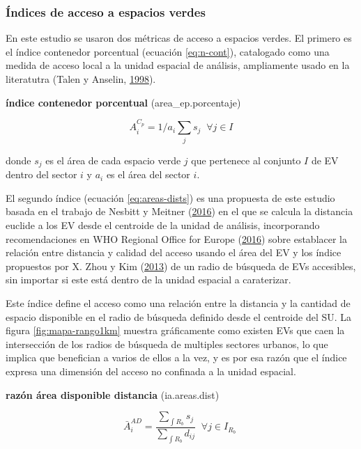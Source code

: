 \documentclass[12pt,a4paper,openany]{book}
\theoremstyle{definition}
\theoremstyle{definition}
\theoremstyle{definition}
\theoremstyle{remark}
\begin{document}
\subsubsection{Índices de acceso a espacios
verdes}\label{indices-de-acceso-a-espacios-verdes}

En este estudio se usaron dos métricas de acceso a espacios verdes. El
primero es el índice contenedor porcentual (ecuación \eqref{eq:n-cont}),
catalogado como una medida de acceso local a la unidad espacial de
análisis, ampliamente usado en la literatutra (Talen y Anselin,
\protect\hyperlink{ref-talen_assessing_1998}{1998}).

\textbf{índice contenedor porcentual} (area\_ep.porcentaje)

\begin{equation}
A^{C_p}_i =1/a_i\sum_j{s_j} \;  \; \forall  j \in I
\label{eq:n-cont}
\end{equation}

donde \(s_j\) es el área de cada espacio verde \(j\) que pertenece al
conjunto \(I\) de EV dentro del sector \(i\) y \(a_i\) es el área del
sector \(i\).

El segundo índice (ecuación \eqref{eq:areas-dists}) es una propuesta de
este estudio basada en el trabajo de Nesbitt y Meitner
(\protect\hyperlink{ref-nesbitt_exploring_2016}{2016}) en el que se
calcula la distancia euclide a los EV desde el centroide de la unidad de
análisis, incorporando recomendaciones en WHO Regional Office for Europe
(\protect\hyperlink{ref-who2016urban}{2016}) sobre establacer la
relación entre distancia y calidad del acceso usando el área del EV y
los índice propuestos por X. Zhou y Kim
(\protect\hyperlink{ref-zhou_social_2013}{2013}) de un radio de búsqueda
de EVs accesibles, sin importar si este está dentro de la unidad
espacial a caraterizar.

Este índice define el acceso como una relación entre la distancia y la
cantidad de espacio disponible en el radio de búsqueda definido desde el
centroide del SU. La figura \ref{fig:mapa-rango1km} muestra gráficamente
como existen EVs que caen la intersección de los radios de búsqueda de
multiples sectores urbanos, lo que implica que benefician a varios de
ellos a la vez, y es por esa razón que el índice expresa una dimensión
del acceso no confinada a la unidad espacial.

\textbf{razón área disponible distancia} (ia.areas.dist)

\begin{equation}
\bar{A}^{AD}_i= \frac{\sum_{\int R_b }{s_j}}{\sum_{\int R_b }{d_{ij}}}  \;  \; \forall  j \in I_{R_b} \; 
\label{eq:areas-dists}
\end{equation}
\end{document}
